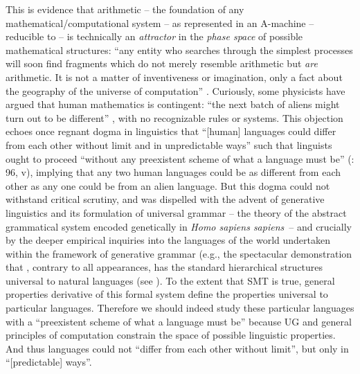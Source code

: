 \documentclass[output=paper]{langsci/langscibook}
\begin{document}
This is evidence that arithmetic – the foundation of any
mathematical/com\-pu\-tational system – as represented in an A-machine – reducible
to  – is technically an \emph{attractor} in the \emph{phase space}
of possible mathematical structures: “any entity who searches through the
simplest processes will soon find fragments which do not merely resemble
arithmetic but \emph{are} arithmetic. It is not a matter of inventiveness or
imagination, only a fact about the geography of the universe of computation”
\citep[122]{Minsky1985}. Curiously, some physicists have argued that human
mathematics is contingent: “the next batch of aliens might turn out to be
different” \citep[774]{HutAlfordTegmark2006}, with no recognizable rules or
systems. This objection echoes once regnant dogma in linguistics that “[human]
languages could differ from each other without limit and in unpredictable ways”
such that linguists ought to proceed “without any preexistent scheme of what a
language must be” (\citealt{Joos1957}: 96, v), implying that any two human
languages could be as different from each other as any one could be from an
alien language. But this dogma could not withstand critical scrutiny, and was
dispelled with the advent of generative linguistics and its formulation of
universal grammar – the theory of the abstract grammatical system encoded
genetically in \emph{Homo sapiens sapiens}~– and crucially by the deeper
empirical inquiries into the languages of the world undertaken within the
framework of generative grammar (e.g., the spectacular demonstration that
, contrary to all appearances, has the standard hierarchical
structures universal to natural languages (see \citealt{Hale1976,Legate2001}).
To the extent that \gls{SMT} is true, general
properties derivative of this formal system define the properties universal to
particular languages.  Therefore we should indeed study these particular
languages with a “preexistent scheme of what a language must be” because
\gls{UG} and general principles of computation constrain
the space of possible linguistic properties. And thus languages could not
“differ from each other without limit”, but only in “[predictable] ways”.
\end{document}
